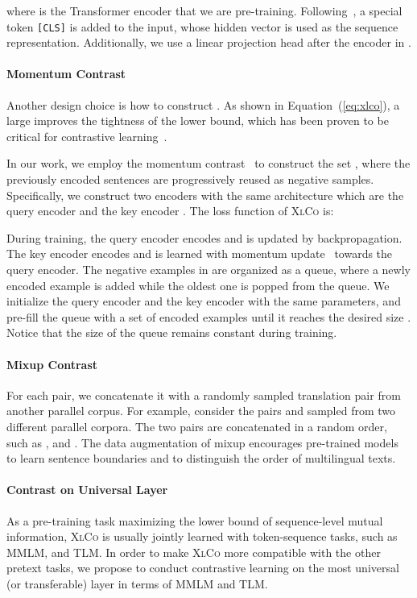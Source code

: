 \documentclass[11pt,a4paper]{article}
\newcommand{\sptk}[1]{\texttt{[#1]}}
\newcommand{\eqform}[1]{Equation~(\ref{#1})}
\newcommand\xlco{\textsc{XlCo}}
\begin{document}
where  is the Transformer encoder that we are pre-training.
Following~\cite{bert}, a special token \sptk{CLS} is added to the input, whose hidden vector is used as the sequence representation.
Additionally, we use a linear projection head after the encoder in .

\paragraph{Momentum Contrast}
Another design choice is how to construct .
As shown in \eqform{eq:xlco}, a large  improves the tightness of the lower bound, which has been proven to be critical for contrastive learning~\cite{simclr}.

In our work, we employ the momentum contrast~\cite{moco} to construct the set , where the previously encoded sentences are progressively reused as negative samples.
Specifically, we construct two encoders with the same architecture which are the query encoder  and the key encoder .
The loss function of \xlco{} is:


During training, the query encoder  encodes  and is updated by backpropagation.
The key encoder  encodes  and is learned with momentum update~\cite{moco} towards the query encoder.
The negative examples in  are organized as a queue, where a newly encoded example is added while the oldest one is popped from the queue.
We initialize the query encoder and the key encoder with the same parameters, and pre-fill the queue with a set of encoded examples until it reaches the desired size .
Notice that the size of the queue remains constant during training.


\paragraph{Mixup Contrast}
For each pair, we concatenate it with a randomly sampled translation pair from another parallel corpus.
For example, consider the pairs  and  sampled from two different parallel corpora.
The two pairs are concatenated in a random order, such as , and .
The data augmentation of mixup encourages pre-trained models to learn sentence boundaries and to distinguish the order of multilingual texts. 


\paragraph{Contrast on Universal Layer}
As a pre-training task maximizing the lower bound of sequence-level mutual information, \xlco{} is usually jointly learned with token-sequence tasks, such as MMLM, and TLM.
In order to make \xlco{} more compatible with the other pretext tasks, we propose to conduct contrastive learning on the most universal (or transferable) layer in terms of MMLM and TLM.
\end{document}
